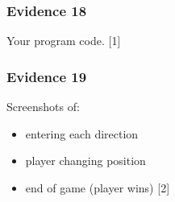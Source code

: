 \subsubsection*{Evidence 18}

Your program code. \hfill{} {[}1{]}

\subsubsection*{Evidence 19}

Screenshots of:
\begin{itemize}
\item entering each direction
\item player changing position
\item end of game (player wins) \hfill{} {[}2{]}
\end{itemize}